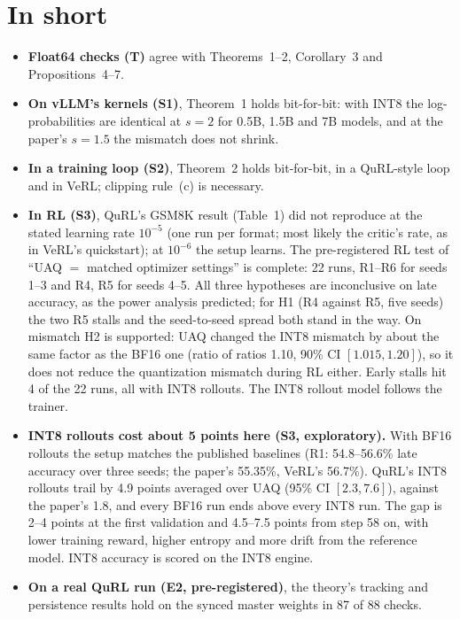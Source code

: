 \documentclass[11pt]{article}
\begin{document}
\section*{In short}
\begin{itemize}
\item \textbf{Float64 checks (T)} agree with Theorems~1--2, Corollary~3 and Propositions~4--7.
\item \textbf{On vLLM's kernels (S1)}, Theorem~1 holds bit-for-bit: with INT8 the log-probabilities are identical at $s=2$ for 0.5B, 1.5B and 7B models, and at the paper's $s=1.5$ the mismatch does not shrink.
\item \textbf{In a training loop (S2)}, Theorem~2 holds bit-for-bit, in a QuRL-style loop and in VeRL; clipping rule~(c) is necessary.
\item \textbf{In RL (S3)}, QuRL's GSM8K result (Table~1) did not reproduce at the stated learning rate $10^{-5}$ (one run per format; most likely the critic's rate, as in VeRL's quickstart); at $10^{-6}$ the setup learns. The pre-registered RL test of ``UAQ $=$ matched optimizer settings'' is complete: 22 runs, R1--R6 for seeds 1--3 and R4, R5 for seeds 4--5. All three hypotheses are inconclusive on late accuracy, as the power analysis predicted; for H1 (R4 against R5, five seeds) the two R5 stalls and the seed-to-seed spread both stand in the way. On mismatch H2 is supported: UAQ changed the INT8 mismatch by about the same factor as the BF16 one (ratio of ratios 1.10, 90\% CI $[1.015, 1.20]$), so it does not reduce the quantization mismatch during RL either. Early stalls hit 4 of the 22 runs, all with INT8 rollouts. The INT8 rollout model follows the trainer.
\item \textbf{INT8 rollouts cost about 5 points here (S3, exploratory).} With BF16 rollouts the setup matches the published baselines (R1: 54.8--56.6\% late accuracy over three seeds; the paper's 55.35\%, VeRL's 56.7\%). QuRL's INT8 rollouts trail by 4.9 points averaged over UAQ (95\% CI $[2.3, 7.6]$), against the paper's 1.8, and every BF16 run ends above every INT8 run. The gap is 2--4 points at the first validation and 4.5--7.5 points from step 58 on, with lower training reward, higher entropy and more drift from the reference model. INT8 accuracy is scored on the INT8 engine.
\item \textbf{On a real QuRL run (E2, pre-registered)}, the theory's tracking and persistence results hold on the synced master weights in 87 of 88 checks.
  \begin{itemize}

\end{itemize}
\end{itemize}
\end{document}

